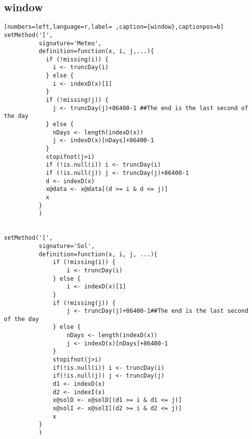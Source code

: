 \subsection{window}
\label{sec:org26bb65b}
\label{subsec:window}
\begin{lstlisting}[numbers=left,language=r,label= ,caption={window},captionpos=b]
setMethod('[',
          signature='Meteo',
          definition=function(x, i, j,...){
            if (!missing(i)) {
              i <- truncDay(i)
            } else {
              i <- indexD(x)[1]
            }
            if (!missing(j)) {
              j <- truncDay(j)+86400-1 ##The end is the last second of the day
            } else {
              nDays <- length(indexD(x))
              j <- indexD(x)[nDays]+86400-1
            }
            stopifnot(j>i)
            if (!is.null(i)) i <- truncDay(i)
            if (!is.null(j)) j <- truncDay(j)+86400-1
            d <- indexD(x)
            x@data <- x@data[(d >= i & d <= j)]
            x
          }
          )


setMethod('[',
          signature='Sol',
          definition=function(x, i, j, ...){
              if (!missing(i)) {
                  i <- truncDay(i)
              } else {
                  i <- indexD(x)[1]
              }
              if (!missing(j)) {
                  j <- truncDay(j)+86400-1##The end is the last second of the day
              } else {
                  nDays <- length(indexD(x))
                  j <- indexD(x)[nDays]+86400-1
              }
              stopifnot(j>i)
              if(!is.null(i)) i <- truncDay(i)
              if(!is.null(j)) j <- truncDay(j)
              d1 <- indexD(x)
              d2 <- indexI(x)
              x@solD <- x@solD[(d1 >= i & d1 <= j)]
              x@solI <- x@solI[(d2 >= i & d2 <= j)]
              x
          }
          )


\end{lstlisting}
